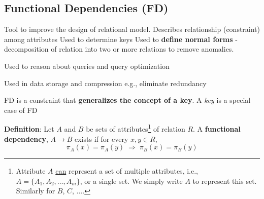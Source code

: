 \documentclass{article}
\newtheorem{definition}{Definition}
\begin{document}
  
\subsection*{Functional Dependencies (FD)}

 
 
 \begin{outline}
 
 \1 Tool to improve the design of relational model.
        \2 Describes relationship (constraint) among attributes
        \2 Used to determine keys
        \2  Used to \textbf{define normal forms} - decomposition of relation             into two or more relations to remove anomalies.
            
          
         \2 Used to reason about queries and query optimization
         
         \2 Used in data storage and compression %
                \3 e.g., eliminate redundancy
                
        
         
 
 \1 FD is a  constraint that \textbf{generalizes the concept of a key}.         \2 A \textit{key} is a special case of FD
 









\1[] \textbf{Definition}:  Let $A$ and $B$ be sets of attributes\footnote{  Attribute $A$ \underline{can} represent a set of multiple attributes,
i.e.,  $A = \{A_1, A_2, \dots, A_m \}$, or a single set.  We simply write $A$ to represent
this set.  Similarly for $B$, $C$, $\dots$.} of relation
$R$.  A \textbf{functional dependency}, $A \to B$ exists if for every $x, y \in R$, 
\[
\pi_A(x) = \pi_A(y) \; \Rightarrow \; \pi_B(x) = \pi_B(y)
\]


\end{outline}
\end{document}
